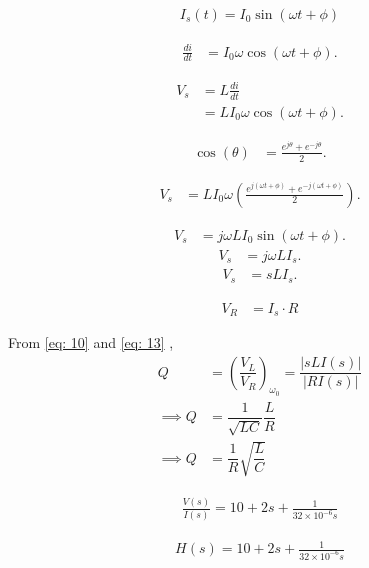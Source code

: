 \documentclass[journal,12pt,twocolumn]{IEEEtran}
\theoremstyle{remark}
\begin{document}
\begin{align}
I_s(t) = I_0 \sin(\omega t + \phi)
\end{align}

\begin{align}
    \frac{di}{dt} & = I_0 \omega \cos(\omega t + \phi).
\end{align}

\begin{align}
    V_s & = L \frac{di}{dt} \\
    & = L I_0 \omega \cos(\omega t + \phi).
\end{align}


\begin{align}
    \cos(\theta) & = \frac{e^{j\theta} + e^{-j\theta}}{2}.
\end{align}

\begin{align}
    V_s & = L I_0 \omega \left(\frac{e^{j(\omega t + \phi)} + e^{-j(\omega t + \phi)}}{2}\right).
\end{align}

\begin{align}
    V_s & = j\omega L I_0 \sin(\omega t + \phi).
\end{align}
\begin{align}
    V_s & = j\omega L I_s.
\end{align}
\begin{align}
    V_s & = s L I_s.\label{eq: 10}
\end{align}

\begin{align}
    V_R & = I_s \cdot R\label{eq: 13}
\end{align}

From \eqref{eq: 10} and \eqref{eq: 13} , 
\begin{align}
    Q &= \left(\dfrac{V_L}{V_R}\right)_{\omega_0} = \dfrac{\lvert{sLI(s)}\rvert}{\lvert RI(s) \rvert}\\
    \implies Q &= \dfrac{1}{\sqrt{LC}}\dfrac{L}{R}\\
    \implies Q &= \dfrac{1}{R}\sqrt{\dfrac{L}{C}}\label{eq: 9}
\end{align}

\begin{align}
\frac{V(s)}{I(s)} = 10 + 2s + \frac{1}{32 \times 10^{-6}s}
\end{align}

\begin{align}
H(s) = 10 + 2s + \frac{1}{32 \times 10^{-6}s}
\end{align}
\end{document}
